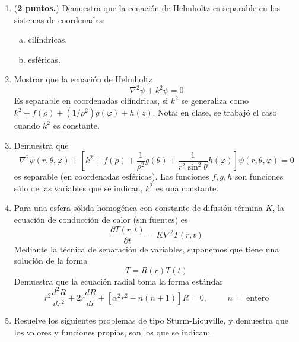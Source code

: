 \begin{enumerate}
\item (\textbf{2 puntos.}) Demuestra que la ecuación de Helmholtz es separable en los sistemas de coordenadas:
\begin{enumerate}[a)]
\item cilíndricas.
\item esféricas.
\end{enumerate}
\item Mostrar que la ecuación de Helmholtz
\[ \nabla^{2} \psi + k^{2} \psi = 0 \]
Es separable en coordenadas cilíndricas, si $k^{2}$ se generaliza como $k^{2} + f(\rho) + (1/\rho^{2}) g(\varphi) +  h(z)$. Nota: en clase, se trabajó el caso cuando $k^{2}$ es constante.
\item Demuestra que
\[ \nabla^{2} \psi(r,\theta,\varphi) + \left[ k^{2} + f(\rho) + \dfrac{1}{\rho^{2}} g(\theta) + \dfrac{1}{r^{2}\sin^{2} \theta} h(\varphi) \right] \psi (r,\theta,\varphi) = 0 \]
es separable (en coordenadas esféricas). Las funciones $f,g,h$ son funciones sólo de las variables que se indican, $k^{2}$ es una constante.
\item Para una esfera sólida homogénea con constante de difusión términa $K$, la ecuación de conducción de calor (sin fuentes) es
\[ \dfrac{\partial T(r,t)}{\partial t} =  K \nabla^{2} T(r,t) \]
Mediante la técnica de separación de variables, suponemos que tiene una solución de la forma
\[ T =R(r) T(t) \]
Demuestra que la ecuación radial toma la forma estándar
\[ r^{2} \dfrac{d^{2} R}{d r^{2}} + 2r \dfrac{d R}{d r} + \left[ \alpha^{2} r^{2} - n(n+1) \right] R = 0, \hspace{1cm} n = \mbox{ entero} \]
\item Resuelve los siguientes problemas de tipo Sturm-Liouville, y demuestra que los valores y funciones propias, son los que se indican:
\begin{enumerate}[label=(\alph*)]
\setlength\itemsep{1em}
\end{enumerate}
\end{enumerate}
